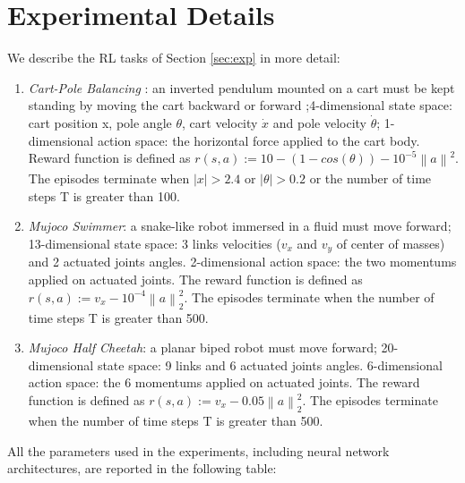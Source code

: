 \documentclass{article}
\theoremstyle{remark}
\theoremstyle{definition}
\newcommand{\norm}[2][\infty]{\left\|#2\right\|_{#1}}
\begin{document}
\section{Experimental Details}\label{app:exp}
We describe the RL tasks of Section \ref{sec:exp} in more detail:
\begin{enumerate}
	\item \emph{Cart-Pole Balancing} : an inverted pendulum mounted on a cart must be kept standing by moving the cart backward or forward ;4-dimensional state space: cart position x, pole angle $\theta$, cart velocity $\dot{x}$ and pole velocity $\dot{\theta}$; 1-dimensional action space: the horizontal force applied to the cart body. Reward function  is defined as $r(s, a) := 10 - (1 - cos(\theta)) - 10^{-5}\norm[] a^2$. The episodes terminate when $|x|>2.4$ or $|\theta|>0.2$ or the number of time steps T is greater than 100.
    \item \emph{Mujoco Swimmer}: a snake-like robot immersed in a fluid must move forward; 13-dimensional state space: 3 links velocities ($v_x$ and $v_y$ of center of masses) and 2 actuated joints angles. 2-dimensional action space: the two momentums applied on actuated joints.  The reward function is defined as $r(s, a) := v_x - 10^{-4}\norm[2]{a}^2$. The episodes terminate when the number of time steps T is greater than 500.
    \item \emph{Mujoco Half Cheetah}: a planar biped robot must move forward; 20-dimensional state space: 9 links and 6 actuated joints angles. 6-dimensional action space: the 6 momentums applied on actuated joints.  The reward function is defined as $r(s, a) := v_x - 0.05\norm[2]{a}^2$. The episodes terminate when the number of time steps T is greater than 500.
\end{enumerate}

All the parameters used in the experiments, including neural network architectures, are reported in the following table:
\end{document}
